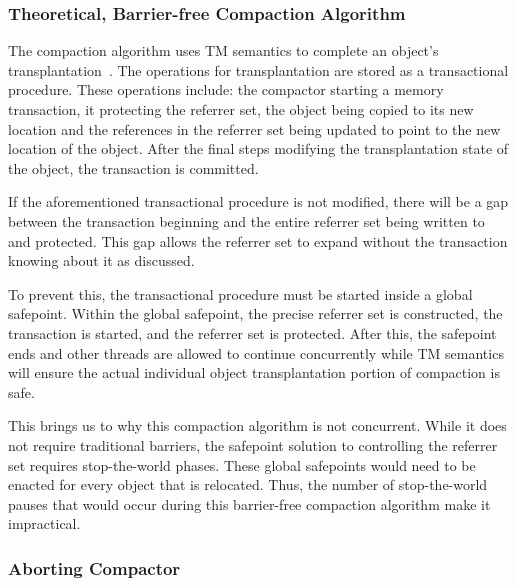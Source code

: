 \documentclass{sig-alternate}
\begin{document}
\subsubsection{Theoretical, Barrier-free Compaction Algorithm}
\label{sec:collieAlgorithmNoBarriers}

The compaction algorithm uses TM semantics to complete an object's
transplantation~\cite{Iyengar:Collie}. The operations for transplantation are stored as a
transactional procedure. These operations include: the compactor 
starting a memory transaction, it protecting the referrer set, 
the object being copied to its new location and the references in the 
referrer set being updated to point to the new location of the object.
After the final steps modifying the transplantation state of the object,
the transaction is committed.

If the aforementioned transactional procedure is not
modified, there will be a gap between the transaction beginning and
the entire referrer set being written to and protected. This gap allows 
the referrer set to expand without the transaction knowing about it
as discussed.

To prevent this, the transactional procedure must be started inside a global safepoint.
Within the global safepoint, the precise referrer
set is constructed, the transaction is started, and the referrer set is protected.
After this, the safepoint ends and other threads are allowed to continue concurrently
while TM semantics will ensure the actual individual object transplantation portion
of compaction is safe.

This brings us to why this compaction algorithm is not concurrent. 
While it does not require traditional barriers, the safepoint solution to
controlling the referrer set
requires stop-the-world phases. These global safepoints would need to be enacted for every 
object that is relocated. Thus, the number of stop-the-world pauses that would occur
during this barrier-free compaction algorithm make it impractical.




\subsubsection{Aborting Compactor}
\label{sec:collieAbortion}
\end{document}

